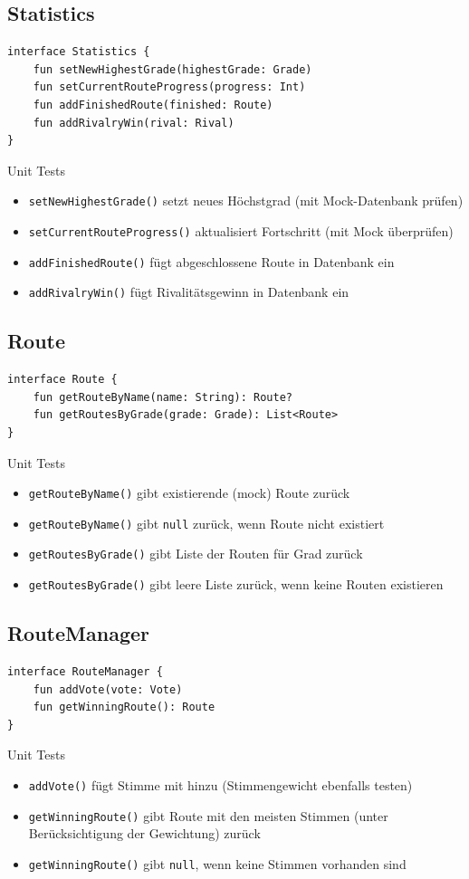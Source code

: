 \documentclass[11pt,a4paper,headsepline,footsepline,bibliography=totocnumbered]{article}
\begin{document}
\subsection{Statistics} 
\begin{verbatim}
interface Statistics {
    fun setNewHighestGrade(highestGrade: Grade)
    fun setCurrentRouteProgress(progress: Int)
    fun addFinishedRoute(finished: Route)
    fun addRivalryWin(rival: Rival)
}
\end{verbatim}
Unit Tests
\begin{itemize}
	\item \texttt{setNewHighestGrade()} setzt neues Höchstgrad (mit Mock-Datenbank prüfen)
	\item \texttt{setCurrentRouteProgress()} aktualisiert Fortschritt (mit Mock überprüfen)
	\item \texttt{addFinishedRoute()} fügt abgeschlossene Route in Datenbank ein
	\item \texttt{addRivalryWin()} fügt Rivalitätsgewinn in Datenbank ein
\end{itemize}

\subsection{Route} 
\begin{verbatim}
interface Route {
    fun getRouteByName(name: String): Route?
    fun getRoutesByGrade(grade: Grade): List<Route>
}
\end{verbatim}
Unit Tests
\begin{itemize}
	\item \texttt{getRouteByName()} gibt existierende (mock) Route zurück
	\item \texttt{getRouteByName()} gibt \texttt{null} zurück, wenn Route nicht existiert
	\item \texttt{getRoutesByGrade()} gibt Liste der Routen für Grad zurück
	\item \texttt{getRoutesByGrade()} gibt leere Liste zurück, wenn keine Routen existieren
\end{itemize}

\subsection{RouteManager} 
\begin{verbatim}
interface RouteManager {
    fun addVote(vote: Vote)
    fun getWinningRoute(): Route
}
\end{verbatim}
Unit Tests
\begin{itemize}
	\item \texttt{addVote()} fügt Stimme mit hinzu (Stimmengewicht ebenfalls testen)
	\item \texttt{getWinningRoute()} gibt Route mit den meisten Stimmen (unter Berücksichtigung der Gewichtung) zurück
	\item \texttt{getWinningRoute()} gibt \texttt{null}, wenn keine Stimmen vorhanden sind
\end{itemize}
\end{document}
